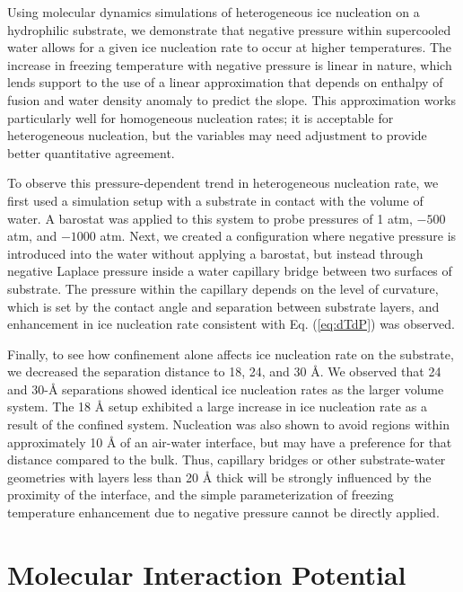 \documentclass[journal abbreviation, manuscript]{copernicus}
\begin{document}
Using molecular dynamics simulations of heterogeneous ice nucleation on a hydrophilic substrate, we demonstrate that negative pressure within supercooled water allows for a given ice nucleation rate to occur at higher temperatures. The increase in freezing temperature with negative pressure is linear in nature, which lends support to the use of a linear approximation that depends on enthalpy of fusion and water density anomaly to predict the slope.  This approximation works particularly well for homogeneous nucleation rates; it is acceptable for heterogeneous nucleation, but the variables may need adjustment to provide better quantitative agreement. 

To observe this pressure-dependent trend in heterogeneous nucleation rate, we first used a simulation setup with a substrate in contact with the volume of water. A barostat was applied to this system to probe pressures of 1 atm, $-500$ atm, and $-1000$ atm. Next, we created a configuration where negative pressure is introduced into the water without applying a barostat, but instead through negative Laplace pressure inside a water capillary bridge between two surfaces of substrate. The pressure within the capillary depends on the level of curvature, which is set by the contact angle and separation between substrate layers, and enhancement in ice nucleation rate consistent with Eq. (\ref{eq:dTdP}) was observed.

Finally, to see how confinement alone affects ice nucleation rate on the substrate, we decreased the separation distance to 18, 24, and 30 \AA{}. We observed that 24 and 30-\AA{} separations showed identical ice nucleation rates as the larger volume system. The 18 \AA{} setup exhibited a large increase in ice nucleation rate as a result of the confined system. Nucleation was also shown to avoid regions within approximately 10 \AA{} of an air-water interface, but may have a preference for that distance compared to the bulk. Thus, capillary bridges or other substrate-water geometries with layers less than 20 \AA{} thick will be strongly influenced by the proximity of the interface, and the simple parameterization of freezing temperature enhancement due to negative pressure cannot be directly applied.  


\appendix
\section{Molecular Interaction Potential}\label{app: potential} 
\end{document}
